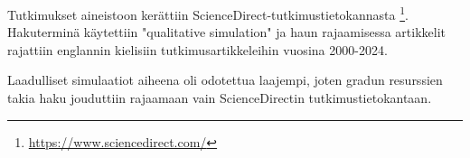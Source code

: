 \documentclass[utf8]{gradu3}
\begin{document}
Tutkimukset aineistoon kerättiin ScienceDirect-tutkimustietokannasta \footnote{\url{https://www.sciencedirect.com/}}. Hakuterminä käytettiin "qualitative simulation" ja haun rajaamisessa artikkelit rajattiin englannin kielisiin tutkimusartikkeleihin vuosina 2000-2024. 
\begin{comment}
Nyt kun sulla on pitkä aikaikkuna, oletko katsonut trendejä ajan suhteen myös. Toisaalta, tuo SD haku 1 viittaisi siihen, että aihe on ollut esillä jo ainakin 50 vuotta, jos ennen 2000 artikkeleita on saman verran kuin tuoreempia. eikös tuo aikarajaus tullut vasta prosessin aikana (vai onko SD haku 1 tehty sanity checkinä rajatummalle haulle?)

Vaihtoehto pitkälle SD haulle olisi toki ollut vuoden snapshot Scholarista. Pystyisitkö perustelemaan, miksi otit mieluummin pitkän jakson. (ajalliset trendit on tietysti hyvä syy, jos niitä tarkastelee).
\end{comment}
\begin{table}[h]
\centering
{}
\caption{Hakutulosten määrä hakukohteista}
\label{table: hakutulokset}
\end{table}

Laadulliset simulaatiot aiheena oli odotettua laajempi, 
joten gradun resurssien takia haku jouduttiin rajaamaan 
vain ScienceDirectin tutkimustietokantaan.
\end{document}
